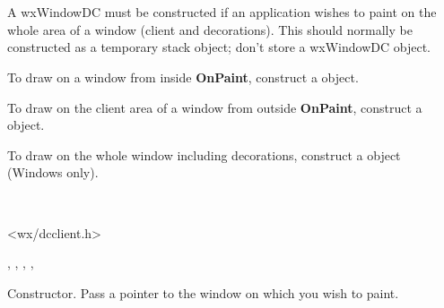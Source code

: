 \section{}\label{wxwindowdc}

A wxWindowDC must be constructed if an application wishes to paint on the
whole area of a window (client and decorations).
This should normally be constructed as a temporary stack object; don't store
a wxWindowDC object.

To draw on a window from inside {\bf OnPaint}, construct a  object.

To draw on the client area of a window from outside {\bf OnPaint}, construct a  object.

To draw on the whole window including decorations, construct a  object
(Windows only).


\\


<wx/dcclient.h>




, , ,\rtfsp
{}, 


\label{wxwindowdcwxwindowdc}


Constructor. Pass a pointer to the window on which you wish to paint.



